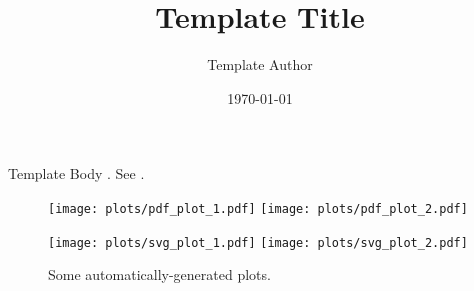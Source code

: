 \documentclass{article}
\title{Template Title}
\author{Template Author}
\date{\today}
\begin{document}
\maketitle

Template Body \cite{lamport1994latex}. See .

\begin{figure}
	\begin{center}
	\texttt{[image: plots/pdf\_plot\_1.pdf]}
	\texttt{[image: plots/pdf\_plot\_2.pdf]}

	\texttt{[image: plots/svg\_plot\_1.pdf]}
	\texttt{[image: plots/svg\_plot\_2.pdf]}
	\par\end{center}

	\caption{\label{fig:plots}Some automatically-generated plots.}
\end{figure}



\end{document}
